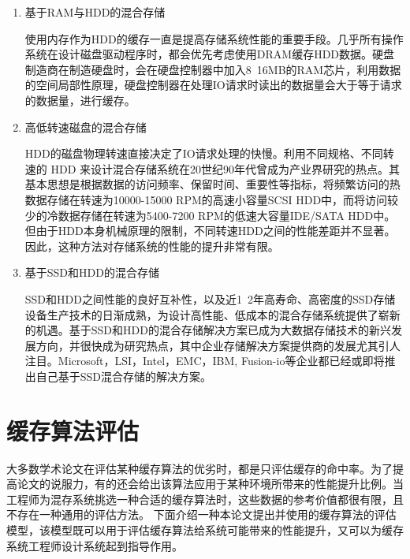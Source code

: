 \begin{enumerate}

\item 基于RAM与HDD的混合存储

使用内存作为HDD的缓存一直是提高存储系统性能的重要手段。几乎所有操作系统在设计磁盘驱动程序时，都会优先考虑使用DRAM缓存HDD数据。硬盘制造商在制造硬盘时，会在硬盘控制器中加入8~16MB的RAM芯片，利用数据的空间局部性原理，硬盘控制器在处理IO请求时读出的数据量会大于等于请求的数据量，进行缓存。

\item 高低转速磁盘的混合存储

HDD的磁盘物理转速直接决定了IO请求处理的快慢。利用不同规格、不同转速的 HDD 来设计混合存储系统在20世纪90年代曾成为产业界研究的热点。其基本思想是根据数据的访问频率、保留时间、重要性等指标，将频繁访问的热数据存储在转速为10000-15000 RPM的高速小容量SCSI HDD中，而将访问较少的冷数据存储在转速为5400-7200 RPM的低速大容量IDE/SATA HDD中。但由于HDD本身机械原理的限制，不同转速HDD之间的性能差距并不显著。因此，这种方法对存储系统的性能的提升非常有限。

\item 基于SSD和HDD的混合存储

SSD和HDD之间性能的良好互补性，以及近1~2年高寿命、高密度的SSD存储设备生产技术的日渐成熟，为设计高性能、低成本的混合存储系统提供了崭新的机遇。基于SSD和HDD的混合存储解决方案已成为大数据存储技术的新兴发展方向，并很快成为研究热点，其中企业存储解决方案提供商的发展尤其引人注目。Microsoft，LSI，Intel，EMC，IBM, Fusion-io等企业都已经或即将推出自己基于SSD混合存储的解决方案。

\end{enumerate}

\section{缓存算法评估}
\label{sec:cache_evaluation}

大多数学术论文在评估某种缓存算法的优劣时，都是只评估缓存的命中率。为了提高论文的说服力，有的还会给出该算法应用于某种环境所带来的性能提升比例。当工程师为混存系统挑选一种合适的缓存算法时，这些数据的参考价值都很有限，且不存在一种通用的评估方法。
下面介绍一种本论文提出并使用的缓存算法的评估模型，该模型既可以用于评估缓存算法给系统可能带来的性能提升，又可以为缓存系统工程师设计系统起到指导作用。

